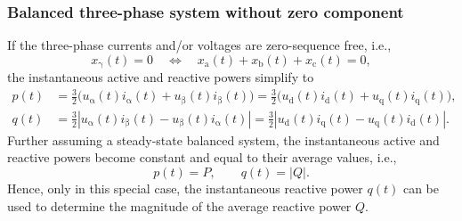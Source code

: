 \begin{frame}
    \frametitle{Balanced three-phase system without zero component}
    If the three-phase currents and/or voltages are zero-sequence free, i.e.,
    \begin{equation}
        x_{\upgamma}(t)=0 \quad \Leftrightarrow \quad x_{\mathrm{a}}(t)+x_{\mathrm{b}}(t)+x_{\mathrm{c}}(t)=0,
    \end{equation}\pause
    the instantaneous active and reactive powers simplify to
    \begin{equation}
        \begin{split}
            p(t) & =\frac{3}{2}\Big(u_{\upalpha}(t)i_{\upalpha}(t)+u_{\upbeta}(t)i_{\upbeta}(t)\Big)
            =\frac{3}{2}\Big(u_{\mathrm{d}}(t)i_{\mathrm{d}}(t)+u_{\mathrm{q}}(t)i_{\mathrm{q}}(t)\Big), \\
            q(t) & =\frac{3}{2}\left|u_{\upalpha}(t)i_{\upbeta}(t)-u_{\upbeta}(t)i_{\upalpha}(t)\right|
            =\frac{3}{2}\left|u_{\mathrm{d}}(t)i_{\mathrm{q}}(t)-u_{\mathrm{q}}(t)i_{\mathrm{d}}(t)\right|.
        \end{split}
    \end{equation}\pause
    Further assuming a steady-state balanced system, the instantaneous active and reactive powers become constant and equal to their average values, i.e.,
    \begin{equation}
        p(t)=P, \qquad q(t)=|Q|.
    \end{equation}\pause
    Hence, only in this special case, the instantaneous reactive power $q(t)$ can be used to determine the magnitude of the average reactive power $Q$.
\end{frame}




